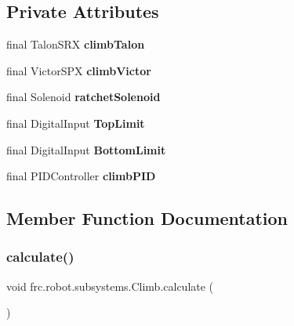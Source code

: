 \subsection*{Private Attributes}
\begin{DoxyCompactItemize}
\item 
\mbox{\label{classfrc_1_1robot_1_1subsystems_1_1_climb_addb9984277fb2d2309dcdfa36d50b902}} 
final Talon\+S\+RX {\bfseries climb\+Talon}
\item 
\mbox{\label{classfrc_1_1robot_1_1subsystems_1_1_climb_a63792942f9705476fcfc9e7f35f9974e}} 
final Victor\+S\+PX {\bfseries climb\+Victor}
\item 
\mbox{\label{classfrc_1_1robot_1_1subsystems_1_1_climb_ab130529109ed07a2a394601aca70a195}} 
final Solenoid {\bfseries ratchet\+Solenoid}
\item 
\mbox{\label{classfrc_1_1robot_1_1subsystems_1_1_climb_a7d4674e151f5ea9b72b9a512143fc918}} 
final Digital\+Input {\bfseries Top\+Limit}
\item 
\mbox{\label{classfrc_1_1robot_1_1subsystems_1_1_climb_a05182237b83c043c66075915e0bd2a80}} 
final Digital\+Input {\bfseries Bottom\+Limit}
\item 
\mbox{\label{classfrc_1_1robot_1_1subsystems_1_1_climb_ab2fa50e18dcf95eaabf622e836f505e7}} 
final P\+I\+D\+Controller {\bfseries climb\+P\+ID}
\end{DoxyCompactItemize}


\subsection{Member Function Documentation}
\mbox{\label{classfrc_1_1robot_1_1subsystems_1_1_climb_a2cc8e00444752afdf9c871aa7adeb13a}} 
\subsubsection{\texorpdfstring{calculate()}{calculate()}}
{\footnotesize\ttfamily void frc.\+robot.\+subsystems.\+Climb.\+calculate (\begin{DoxyParamCaption}{ }\end{DoxyParamCaption})\hspace{0.3cm}{\ttfamily [inline]}}




